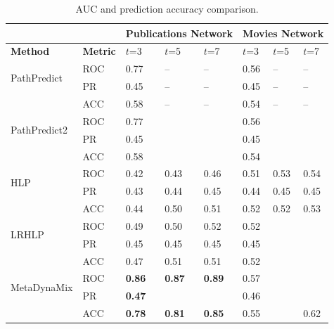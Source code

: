 


\begin{table}[t]
\centering
\caption{AUC and prediction accuracy comparison.}
\label{table_publications}\label{tbl:auc}
\begin{tabular}{ll|p{1cm}|p{1cm}|p{1cm}||p{1cm}|p{1cm}|p{1cm}|}
\cline{3-8}
                        &   & \multicolumn{3}{l||}{Publications Network} & \multicolumn{3}{l|}{Movies Network} \\ \hline
\multicolumn{1}{|l|}{\textbf{Method}} & \textbf{Metric} & $t$=3 & $t$=5  & $t$=7  & $t$=3  & $t$=5  & $t$=7     \\ \hline\hline

\multicolumn{1}{|l|}{\multirow{2}{*}{PathPredict}}  & ROC  & 0.77 & -- & -- & 0.56 & -- & -- \\ \cline{2-8}
\multicolumn{1}{|l|}{}  & PR  & 0.45 & -- & -- & 0.45 & -- & -- \\ \cline{2-8}
\multicolumn{1}{|l|}{}  & ACC  & 0.58 & -- & -- & 0.54  & -- & -- \\ \hline\hline

\multicolumn{1}{|l|}{\multirow{2}{*}{PathPredict2}}  & ROC  &  0.77  &           &           &   0.56   &         &         \\ \cline{2-8}
\multicolumn{1}{|l|}{}  & PR  &   0.45  &           &           &   0.45  &         &         \\ \cline{2-8}
\multicolumn{1}{|l|}{}  & ACC  & 0.58  &    &  & 0.54  &    &    \\ \hline\hline

\multicolumn{1}{|l|}{\multirow{2}{*}{HLP}}  & ROC  &   0.42  &   0.43   &   0.46     &     0.51    &    0.53     &    0.54     \\ \cline{2-8}
\multicolumn{1}{|l|}{}  & PR  &    0.43  &   0.44   &   0.45    &   0.44   &  0.45   &  0.45  \\ \cline{2-8}
\multicolumn{1}{|l|}{}  & ACC  & 0.44  &  0.50  &  0.51 &  0.52  &  0.52  &  0.53  \\ \hline\hline

\multicolumn{1}{|l|}{\multirow{2}{*}{LRHLP}}  & ROC  &   0.49   &   0.50   &   0.52    &    0.52     &         &         \\ \cline{2-8}
\multicolumn{1}{|l|}{}  & PR  &  0.45    &   0.45   &   0.45   &  0.45   &         &         \\ \cline{2-8}
\multicolumn{1}{|l|}{}  & ACC  & 0.47 & 0.51   & 0.51   & 0.52  &    &    \\ \hline\hline

\multicolumn{1}{|l|}{\multirow{2}{*}{MetaDynaMix}}  & ROC  & \textbf{0.86} &  \textbf{0.87}  & \textbf{0.89}   &  0.57  &   &    \\ \cline{2-8}
\multicolumn{1}{|l|}{}  & PR  & \textbf{0.47} &    &    &  0.46 &    &    \\ \cline{2-8}
\multicolumn{1}{|l|}{}  & ACC  & \textbf{0.78} & \textbf{0.81} & \textbf{0.85}   & 0.55  &    &   0.62 \\ \hline

\end{tabular}
\end{table}




